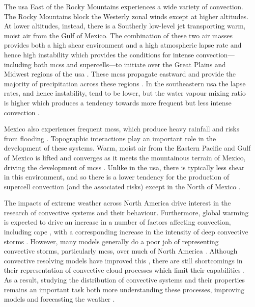 The \acrfull{usa} East of the Rocky Mountains experiences a wide variety of convection.
The Rocky Mountains block the Westerly zonal winds except at higher altitudes.
At lower altitudes, instead, there is a Southerly low-level jet transporting warm, moist air from the Gulf of Mexico.
The combination of these two air masses provides both a high shear environment and a high atmospheric lapse rate and hence high instability which provides the conditions for intense convection---including both \acrshort{mcs}s and supercells---to initiate over the Great Plains and Midwest regions of the \acrshort{usa} \citep{coniglio_environmental_2010, song_contrasting_2019}.
These \acrshort{mcs}s propagate eastward and provide the majority of precipitation across these regions \citep{feng_spatiotemporal_2019}.
In the southeastern \acrshort{usa} the lapse rates, and hence instability, tend to be lower, but the water vapour mixing ratio is higher which produces a tendency towards more frequent but less intense convection \citep{brooks_climatological_2007a}.

Mexico also experiences frequent \acrshort{mcs}s, which produce heavy rainfall and risks from flooding \citep{douglas_mexican_1993}.
Topographic interactions play an important role in the development of these systems.
Warm, moist air from the Eastern Pacific and Gulf of Mexico is lifted and converges as it meets the mountainous terrain of Mexico, driving the development of \acrshort{mcs}s \citep{farfan_moving_1994}.
Unlike in the \acrshort{usa}, there is typically less shear in this environment, and so there is a lower tendency for the production of supercell convection (and the associated risks) except in the North of Mexico \citep{weiss_supercells_2008}.

The impacts of extreme weather across North America drive interest in the research of convective systems and their behaviour.
Furthermore, global warming is expected to drive an increase in a number of factors affecting convection, including \acrshort{cape} \citep{seeley_why_2015}, with a corresponding increase in the intensity of deep convective storms \citep{trapp_changes_2007, seeley_effect_2015}.
However, many models generally do a poor job of representing convective storms, particularly \acrshort{mcs}s, over much of North America \citep{pinto_assessment_2015}.
Although convective resolving models have improved this \citep{stevens_added_2020}, there are still shortcomings in their representation of convective cloud processes which limit their capabilities \citep{jeevanjee_vertical_2017, prein_sensitivity_2021}.
As a result, studying the distribution of convective systems and their properties remains an important task both more understanding these processes, improving models and forecasting the weather \citep{brooks_century_2019}.

